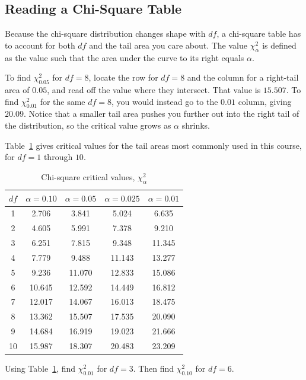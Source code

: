 \subsection{Reading a Chi-Square Table}

Because the chi-square distribution changes shape with $df$, a chi-square table has to account for both $df$ and the tail area you care about. The value $\chi^2_\alpha$ is defined as the value such that the area under the curve to its right equals $\alpha$.

To find $\chi^2_{0.05}$ for $df = 8$, locate the row for $df = 8$ and the column for a right-tail area of $0.05$, and read off the value where they intersect. That value is $15.507$. To find $\chi^2_{0.01}$ for the same $df = 8$, you would instead go to the $0.01$ column, giving $20.09$. Notice that a smaller tail area pushes you further out into the right tail of the distribution, so the critical value grows as $\alpha$ shrinks.

Table~\ref{tab:chisq-critical} gives critical values for the tail areas most commonly used in this course, for $df = 1$ through $10$.

\begin{table}[H]
\centering
\caption{Chi-square critical values, $\chi^2_\alpha$}
\label{tab:chisq-critical}
\begin{tabular}{c|cccc}
$df$ & $\alpha = 0.10$ & $\alpha = 0.05$ & $\alpha = 0.025$ & $\alpha = 0.01$ \\
\hline
1  & 2.706  & 3.841  & 5.024  & 6.635 \\
2  & 4.605  & 5.991  & 7.378  & 9.210 \\
3  & 6.251  & 7.815  & 9.348  & 11.345 \\
4  & 7.779  & 9.488  & 11.143 & 13.277 \\
5  & 9.236  & 11.070 & 12.833 & 15.086 \\
6  & 10.645 & 12.592 & 14.449 & 16.812 \\
7  & 12.017 & 14.067 & 16.013 & 18.475 \\
8  & 13.362 & 15.507 & 17.535 & 20.090 \\
9  & 14.684 & 16.919 & 19.023 & 21.666 \\
10 & 15.987 & 18.307 & 20.483 & 23.209 \\
\end{tabular}
\end{table}

\begin{Exercise}[title={Reading the table}, label={ex:chisq-table-read}]
Using Table~\ref{tab:chisq-critical}, find $\chi^2_{0.01}$ for $df = 3$. Then find $\chi^2_{0.10}$ for $df = 6$.
\end{Exercise}

